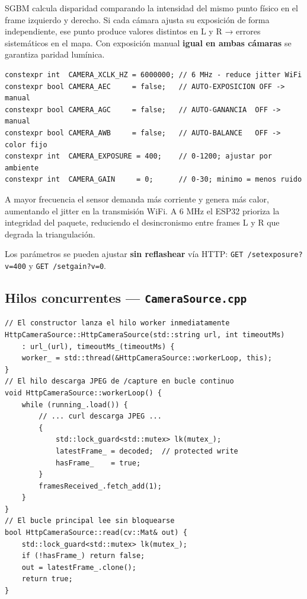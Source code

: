 \documentclass[11pt,a4paper]{article}
\begin{document}
\begin{critbox}[frametitle={Por qué AEC/AGC/AWB = OFF}]
SGBM calcula disparidad comparando la intensidad del mismo punto físico en el frame
izquierdo y derecho. Si cada cámara ajusta su exposición de forma independiente,
ese punto produce valores distintos en L y R → errores sistemáticos en el mapa.
Con exposición manual \textbf{igual en ambas cámaras} se garantiza paridad lumínica.
\end{critbox}

\begin{lstlisting}[caption={Parámetros fijos del firmware (líneas 52–58)}]
constexpr int  CAMERA_XCLK_HZ = 6000000; // 6 MHz - reduce jitter WiFi
constexpr bool CAMERA_AEC     = false;   // AUTO-EXPOSICION OFF -> manual
constexpr bool CAMERA_AGC     = false;   // AUTO-GANANCIA  OFF -> manual
constexpr bool CAMERA_AWB     = false;   // AUTO-BALANCE   OFF -> color fijo
constexpr int  CAMERA_EXPOSURE = 400;    // 0-1200; ajustar por ambiente
constexpr int  CAMERA_GAIN     = 0;      // 0-30; minimo = menos ruido
\end{lstlisting}

\begin{critbox}[frametitle={Por qué XCLK = 6 MHz (no 20 MHz)}]
A mayor frecuencia el sensor demanda más corriente y genera más calor, aumentando
el jitter en la transmisión WiFi. A 6 MHz el ESP32 prioriza la integridad del paquete,
reduciendo el desincronismo entre frames L y R que degrada la triangulación.
\end{critbox}

Los parámetros se pueden ajustar \textbf{sin reflashear} vía HTTP:
\texttt{GET /setexposure?v=400} y \texttt{GET /setgain?v=0}.

\subsection*{Hilos concurrentes — \texttt{CameraSource.cpp}}

\begin{lstlisting}[caption={Hilo productor de frames (HttpCameraSource)}]
// El constructor lanza el hilo worker inmediatamente
HttpCameraSource::HttpCameraSource(std::string url, int timeoutMs)
    : url_(url), timeoutMs_(timeoutMs) {
    worker_ = std::thread(&HttpCameraSource::workerLoop, this);
}
// El hilo descarga JPEG de /capture en bucle continuo
void HttpCameraSource::workerLoop() {
    while (running_.load()) {
        // ... curl descarga JPEG ...
        {
            std::lock_guard<std::mutex> lk(mutex_);
            latestFrame_ = decoded;  // protected write
            hasFrame_    = true;
        }
        framesReceived_.fetch_add(1);
    }
}
// El bucle principal lee sin bloquearse
bool HttpCameraSource::read(cv::Mat& out) {
    std::lock_guard<std::mutex> lk(mutex_);
    if (!hasFrame_) return false;
    out = latestFrame_.clone();
    return true;
}
\end{lstlisting}
\end{document}
